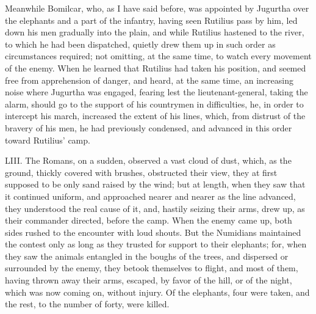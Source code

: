 Meanwhile Bomilcar, who, as I have said before, was appointed by
Jugurtha over the elephants and a part of the infantry, having seen
Rutilius pass by him, led down his men gradually into the plain, and
while Rutilius hastened to the river, to which he had been dispatched,
quietly drew them up in such order as circumstances required; not
omitting, at the same time, to watch every movement of the enemy. When
he learned that Rutilius had taken his position, and seemed free from
apprehension of danger, and heard, at the same time, an increasing
noise where Jugurtha was engaged, fearing lest the lieutenant-general,
taking the alarm, should go to the support of his countrymen in
difficulties, he, in order to intercept his march, increased the
extent of his lines, which, from distrust of the bravery of his men,
he had previously condensed, and advanced in this order toward
Rutilius' camp.

LIII. The Romans, on a sudden, observed a vast cloud of dust, which,
as the ground, thickly covered with brushes, obstructed their view,
they at first supposed to be only sand raised by the wind; but at
length, when they saw that it continued uniform, and approached nearer
and nearer as the line advanced, they understood the real cause of it,
and, hastily seizing their arms, drew up, as their commander directed,
before the camp. When the enemy came up, both sides rushed to the
encounter with loud shouts. But the Numidians maintained the contest
only as long as they trusted for support to their elephants; for, when
they saw the animals entangled in the boughs of the trees, and
dispersed or surrounded by the enemy, they betook themselves to
flight, and most of them, having thrown away their arms, escaped, by
favor of the hill, or of the night, which was now coming on, without
injury. Of the elephants, four were taken, and the rest, to the number
of forty, were killed.

